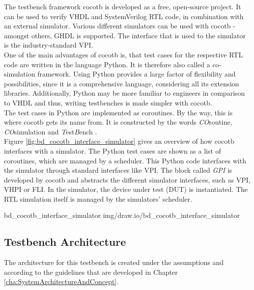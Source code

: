 The testbench framework cocotb is developed as a free, open-source project.
It can be used to verify VHDL and SystemVerilog RTL code, in combination with an external simulator.
Various different simulators can be used with cocotb - amongst others, GHDL is supported.
The interface that is used to the simulator is the industry-standard VPI.\\

One of the main advantages of cocotb is, that test cases for the respective RTL code are written in the language Python.
It is therefore also called a co-simulation framework.
Using Python provides a large factor of flexibility and possibilities, since it is a comprehensive language, considering all its extension libraries.
Additionally, Python may be more familiar to engineers in comparison to VHDL and thus, writing testbenches is made simpler with cocotb.\\

The test cases in Python are implemented as coroutines.
By the way, this is where cocotb gets its name from.
It is constructed by the words \textit{CO}routine, \textit{CO}simulation and \textit{T}est\textit{B}ench \cite{cocotbDoc}.\\

Figure \ref{fig:bd_cocotb_interface_simulator} gives an overview of how cocotb interfaces with a simulator.
The Python test cases are shown as a list of coroutines, which are managed by a scheduler.
This Python code interfaces with the simulator through standard interfaces like VPI.
The block called \textit{GPI} is developed by cocotb and abstracts the different simulator interfaces, such as VPI, VHPI or FLI.
In the simulator, the device under test (DUT) is instantiated.
The RTL simulation itself is managed by the simulators' scheduler.

 {bd_cocotb_interface_simulator} {img/draw.io/bd_cocotb_interface_simulator}

\subsection{Testbench Architecture}
\label{sub:VHDL:TestbenchArchitecture}

The architecture for this testbench is created under the assumptions and according to the guidelines that are developed in Chapter \ref{cha:SystemArchitectureAndConcept}.\\

